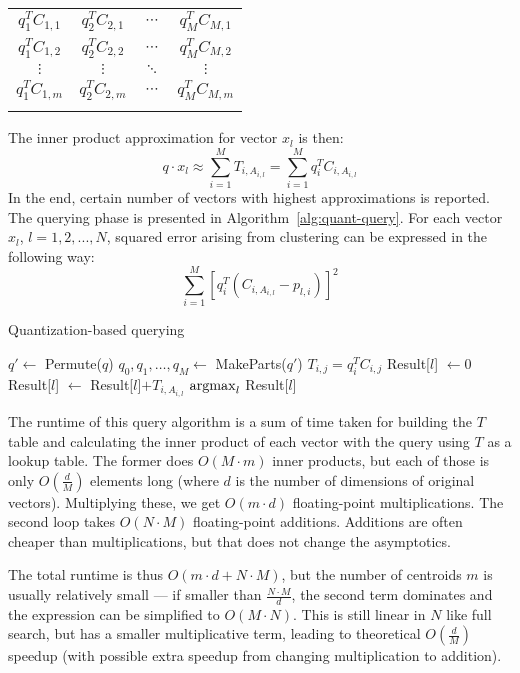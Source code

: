 \renewcommand{\arraystretch}{1.6}
\begin{center}
\begin{tabular}{|c|c|c|c|}
\hhline{----}
$ q_1^T C_{1,1} $ & $ q_2^T C_{2,1} $ & $ \cdots $ & $ q_M^T C_{M,1} $\\
\hhline{----}
$ q_1^T C_{1,2} $ & $ q_2^T C_{2,2} $ & $ \cdots $ & $ q_M^T C_{M,2} $\\
\hhline{----}
$ \vdots $ & $ \vdots $ & $ \ddots $ & $ \vdots $\\
\hhline{----}
$ q_1^T C_{1,m} $ & $ q_2^T C_{2,m} $ & $ \cdots $ & $ q_M^T C_{M,m} $\\
\hhline{----}
\end{tabular}
\end{center}

The inner product approximation for vector $x_l$ is then:
$$q \cdot x_l \approx \sum_{i=1}^{M} T_{i,A_{i,l}} = \sum_{i=1}^{M} q_i^T C_{i,A_{i,l}} $$
In the end, certain number of vectors with highest approximations is reported.
The querying phase is presented in Algorithm~\ref{alg:quant-query}.
For each vector $x_l$, $l = 1,2,...,N$, squared error arising from clustering can be expressed in the following way:
$$ \sum_{i=1}^{M}  [q_{i}^{T} (C_{i, A_{i,l}} - p_{l,i})]^2$$

\begin{algorithm}
	\caption{Quantization-based querying}
	\begin{algorithmic}
		\State $q' \gets$ Permute($q$)
		\State $q_0, q_1, \dots, q_M \gets$ MakeParts($q'$)
				\State $T_{i,j} = q_i^T C_{i,j}$
			\EndFor
		\EndFor
			\State Result[$l$] $\gets 0$
				\State Result[$l$] $\gets$ Result[$l$]$+ T_{i,A_{i,l}}$
			\EndFor
		\EndFor
		\State \Return $\operatorname*{argmax}_{l}$ Result[$l$]
	\end{algorithmic}
\label{alg:quant-query}
\end{algorithm}

The runtime of this query algorithm is a sum of time taken for building the $T$ table and calculating the inner product of each vector with the query using $T$ as a lookup table.
The former does $O(M \cdot m)$ inner products, but each of those is only $O(\frac{d}{M})$
elements long (where $d$ is the number of dimensions of original vectors). 
Multiplying these, we get $O(m \cdot d)$ floating-point multiplications.
The second loop takes $O(N \cdot M)$ floating-point {additions}. Additions are often
cheaper than multiplications, but that does not change the asymptotics.

The total runtime is thus $O(m \cdot d + N \cdot M)$, but the number of centroids $m$ is usually 
relatively small --- if smaller than $\frac{N \cdot M}{d}$, the second term dominates 
and the expression can be simplified to
$O(M \cdot N)$. This is still linear in $N$ like full search, but has a smaller multiplicative
term, leading to theoretical $O(\frac{d}{M})$ speedup (with possible extra speedup from changing
multiplication to addition).

